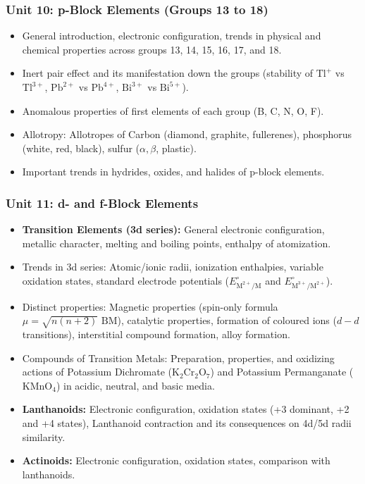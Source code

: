 \documentclass[11pt,a4paper]{article}
\begin{document}
\subsubsection{Unit 10: p-Block Elements (Groups 13 to 18)}
\begin{itemize}
  \item General introduction, electronic configuration, trends in physical and chemical properties across groups 13, 14, 15, 16, 17, and 18.
  \item Inert pair effect and its manifestation down the groups (stability of $\text{Tl}^+$ vs $\text{Tl}^{3+}$, $\text{Pb}^{2+}$ vs $\text{Pb}^{4+}$, $\text{Bi}^{3+}$ vs $\text{Bi}^{5+}$).
  \item Anomalous properties of first elements of each group (B, C, N, O, F).
  \item Allotropy: Allotropes of Carbon (diamond, graphite, fullerenes), phosphorus (white, red, black), sulfur ($\alpha, \beta$, plastic).
  \item Important trends in hydrides, oxides, and halides of p-block elements.
\end{itemize}

\subsubsection{Unit 11: d- and f-Block Elements}
\begin{itemize}
  \item \textbf{Transition Elements (3d series):} General electronic configuration, metallic character, melting and boiling points, enthalpy of atomization.
  \item Trends in 3d series: Atomic/ionic radii, ionization enthalpies, variable oxidation states, standard electrode potentials ($E^\circ_{\text{M}^{2+}/\text{M}}$ and $E^\circ_{\text{M}^{3+}/\text{M}^{2+}}$).
  \item Distinct properties: Magnetic properties (spin-only formula $\mu = \sqrt{n(n+2)}\text{ BM}$), catalytic properties, formation of coloured ions ($d-d$ transitions), interstitial compound formation, alloy formation.
  \item Compounds of Transition Metals: Preparation, properties, and oxidizing actions of Potassium Dichromate ($\text{K}_2\text{Cr}_2\text{O}_7$) and Potassium Permanganate ($\text{KMnO}_4$) in acidic, neutral, and basic media.
  \item \textbf{Lanthanoids:} Electronic configuration, oxidation states (+3 dominant, +2 and +4 states), Lanthanoid contraction and its consequences on 4d/5d radii similarity.
  \item \textbf{Actinoids:} Electronic configuration, oxidation states, comparison with lanthanoids.
\end{itemize}
\end{document}
